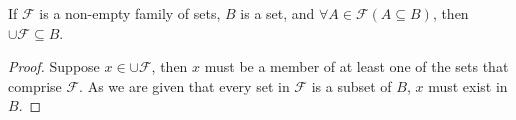 
\begin{theorem}
  If $\mathscr{F}$ is a non-empty family of sets, $B$ is a set, and $\forall A
  \in \mathscr{F} (A \subseteq B)$, then $\cup \mathscr{F} \subseteq B$.
\end{theorem}

\begin{proof}
  Suppose $x \in \cup\mathscr{F}$, then $x$ must be a member of at least one
  of the sets that comprise $\mathscr{F}$. As we are given that every set in
  $\mathscr{F}$ is a subset of $B$, $x$ must exist in $B$. 
\end{proof}



\begin{align*}
\end{align*}
